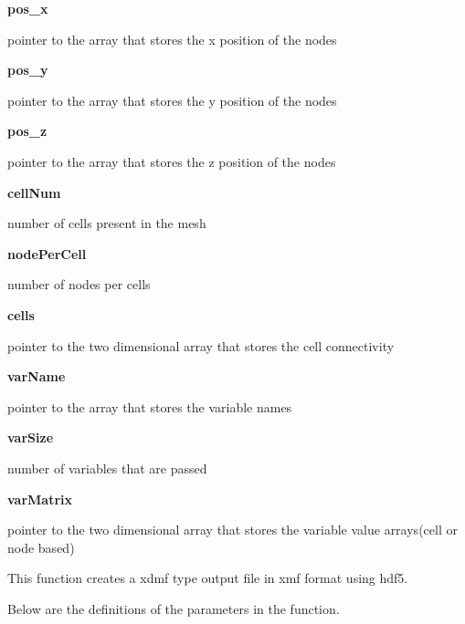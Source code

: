\documentclass{article}
\begin{document}
        {\bf pos\_x} \par pointer to the array that stores the x position of the nodes
\medskip
        
        {\bf pos\_y} \par pointer to the array that stores the y position of the nodes
\medskip
        
        {\bf pos\_z} \par pointer to the array that stores the z position of the nodes
\medskip
        
        {\bf cellNum} \par number of cells present in the mesh
\medskip
        
        {\bf nodePerCell} \par number of nodes per cells 
\medskip
        
        {\bf cells} \par pointer to the two dimensional array that stores the cell connectivity
\medskip
        
        {\bf varName} \par pointer to the array that stores the variable names
\medskip
        
        {\bf varSize} \par number of variables that are passed 
\medskip
        
        {\bf varMatrix} \par pointer to the two dimensional array that stores the variable value arrays(cell or node based) 

\newpage

\bigskip

        \par This function creates a xdmf type output file in xmf format using hdf5.
\bigskip
        
        \par Below are the definitions of the parameters in the function.
\medskip
\end{document}
